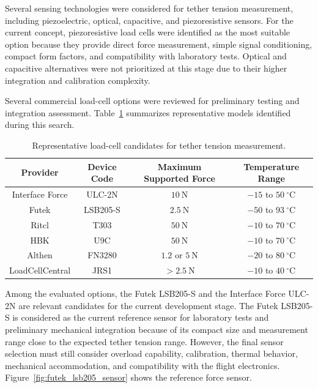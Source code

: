 Several sensing technologies were considered for tether tension measurement, including piezoelectric, optical, capacitive, and piezoresistive sensors. For the current concept, piezoresistive load cells were identified as the most suitable option because they provide direct force measurement, simple signal conditioning, compact form factors, and compatibility with laboratory tests. Optical and capacitive alternatives were not prioritized at this stage due to their higher integration and calibration complexity.

Several commercial load-cell options were reviewed for preliminary testing and integration assessment. Table~\ref{tab:tension_sensor_candidates} summarizes representative models identified during this search.

\begin{table}[htbp]
\centering
\caption{Representative load-cell candidates for tether tension measurement.}
\label{tab:tension_sensor_candidates}
\small
\renewcommand{\arraystretch}{1.2}
\begin{tabular}{|c|c|c|c|}
\hline
Provider & Device Code & Maximum Supported Force & Temperature Range \\ \hline
Interface Force & ULC-2N & \(10~\mathrm{N}\) & \(-15\) to \(50~^\circ\mathrm{C}\) \\ \hline
Futek & LSB205-S & \(2.5~\mathrm{N}\) & \(-50\) to \(93~^\circ\mathrm{C}\) \\ \hline
Ritcl & T303 & \(50~\mathrm{N}\) & \(-10\) to \(70~^\circ\mathrm{C}\) \\ \hline
HBK & U9C & \(50~\mathrm{N}\) & \(-10\) to \(70~^\circ\mathrm{C}\) \\ \hline
Althen & FN3280 & \(1.2\) or \(5~\mathrm{N}\) & \(-20\) to \(80~^\circ\mathrm{C}\) \\ \hline
LoadCellCentral & JRS1 & \(>2.5~\mathrm{N}\) & \(-10\) to \(40~^\circ\mathrm{C}\) \\ \hline
\end{tabular}
\end{table}

Among the evaluated options, the Futek LSB205-S and the Interface Force ULC-2N are relevant candidates for the current development stage. The Futek LSB205-S is considered as the current reference sensor for laboratory tests and preliminary mechanical integration because of its compact size and measurement range close to the expected tether tension range. However, the final sensor selection must still consider overload capability, calibration, thermal behavior, mechanical accommodation, and compatibility with the flight electronics. Figure~\ref{fig:futek_lsb205_sensor} shows the reference force sensor.

